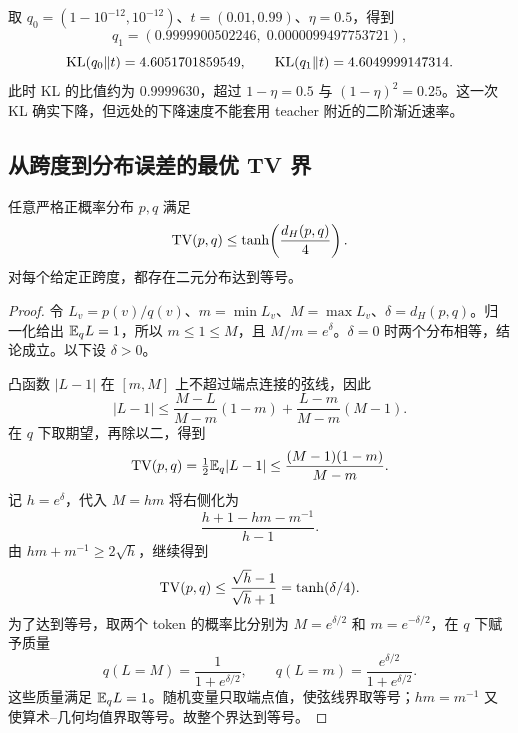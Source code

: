 取 $q_0=(1-10^{-12},10^{-12})$、$t=(0.01,0.99)$、$\eta=0.5$，得到
\begin{equation*}
 q_1=(0.9999900502246,\;0.0000099497753721),
\end{equation*}
\begin{equation*}
 \operatorname{KL}(q_0\Vert t)=4.6051701859549,
 \qquad\operatorname{KL}(q_1\Vert t)=4.6049999147314.
\end{equation*}
此时 KL 的比值约为 $0.9999630$，超过 $1-\eta=0.5$ 与 $(1-\eta)^2=0.25$。这一次 KL 确实下降，但远处的下降速度不能套用 teacher 附近的二阶渐近速率。

\subsection{从跨度到分布误差的最优 TV 界}

\begin{theorem}
\label{dyn:thm:hs-sharp-tv}
任意严格正概率分布 $p,q$ 满足
\begin{equation}\label{dyn:eq:hs-sharp-tv}
 \operatorname{TV}(p,q)\leq\tanh\!\left(\frac{d_H(p,q)}4\right).
\end{equation}
对每个给定正跨度，都存在二元分布达到等号。
\end{theorem}

\begin{proof}
令 $L_v=p(v)/q(v)$、$m=\min L_v$、$M=\max L_v$、$\delta=d_H(p,q)$。归一化给出 $\mathbb E_qL=1$，所以 $m\leq1\leq M$，且 $M/m=e^\delta$。$\delta=0$ 时两个分布相等，结论成立。以下设 $\delta>0$。

凸函数 $|L-1|$ 在 $[m,M]$ 上不超过端点连接的弦线，因此
\begin{equation*}
 |L-1|\leq\frac{M-L}{M-m}(1-m)
 +\frac{L-m}{M-m}(M-1).
\end{equation*}
在 $q$ 下取期望，再除以二，得到
\begin{equation*}
 \operatorname{TV}(p,q)=\tfrac12\mathbb E_q|L-1|
 \leq\frac{(M-1)(1-m)}{M-m}.
\end{equation*}
记 $h=e^\delta$，代入 $M=hm$ 将右侧化为
\begin{equation*}
 \frac{h+1-hm-m^{-1}}{h-1}.
\end{equation*}
由 $hm+m^{-1}\geq2\sqrt h$，继续得到
\begin{equation*}
 \operatorname{TV}(p,q)\leq\frac{\sqrt h-1}{\sqrt h+1}
 =\tanh(\delta/4).
\end{equation*}
为了达到等号，取两个 token 的概率比分别为 $M=e^{\delta/2}$ 和 $m=e^{-\delta/2}$，在 $q$ 下赋予质量
\begin{equation*}
 q(L=M)=\frac1{1+e^{\delta/2}},\qquad
 q(L=m)=\frac{e^{\delta/2}}{1+e^{\delta/2}}.
\end{equation*}
这些质量满足 $\mathbb E_qL=1$。随机变量只取端点值，使弦线界取等号；$hm=m^{-1}$ 又使算术--几何均值界取等号。故整个界达到等号。
\end{proof}

